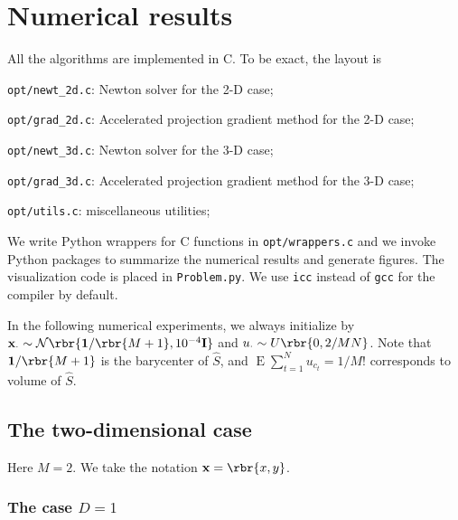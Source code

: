\documentclass[english, nochinese]{pnote}
\DeclareMathOperator{\ope}{\mathrm{E}}
\begin{document}
\section{Numerical results}

All the algorithms are implemented in C. To be exact, the layout is
\begin{partlist}
\item \verb"opt/newt_2d.c": Newton solver for the 2-D case;
\item \verb"opt/grad_2d.c": Accelerated projection gradient method for the 2-D case;
\item \verb"opt/newt_3d.c": Newton solver for the 3-D case;
\item \verb"opt/grad_3d.c": Accelerated projection gradient method for the 3-D case;
\item \verb"opt/utils.c": miscellaneous utilities;
\end{partlist}
We write Python wrappers for C functions in \verb"opt/wrappers.c" and we invoke Python packages to summarize the numerical results and generate figures. The visualization code is placed in \verb"Problem.py". We use \verb"icc" instead of \verb"gcc" for the compiler by default.

In the following numerical experiments, we always initialize by $ \mathbf{x}_{\cdot} \sim \mathcal{N} \rbr{ \mathbf{1} / \rbr{ M + 1 }, 10^{-4} \mathbf{I} } $ and $ u_{\cdot} \sim U \rbr{ 0, 2 / M N } $. Note that $ \mathbf{1} / \rbr{ M + 1 } $ is the barycenter of $\hat{S}$, and $ \ope \sum_{ t = 1 }^N u_{c_t} = 1 / M ! $ corresponds to volume of $\hat{S}$.

\subsection{The two-dimensional case}

Here $ M = 2 $. We take the notation $ \mathbf{x} = \rbr{ x, y } $.

\subsubsection{The case $ D = 1 $}
\end{document}
